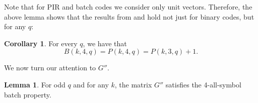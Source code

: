 \documentclass[11pt,a4paper]{article}
\theoremstyle{definition}
\newtheorem{corollary}[theorem]{Corollary}
\newtheorem{lemma}[theorem]{Lemma}
\begin{document}
Note that for PIR and batch codes we consider only unit vectors. Therefore, the above lemma shows that the results from \cite[Lemma 5]{VARDY_YAAKOBI_2016} and \cite[Lemma 14]{FAZELI2015} hold not just for binary codes, but for any $q$:

\begin{corollary}\label{COR:BatchFor_k=4_general_q}
    For every $q$, we have that
    $$
        B(k,4,q) = P(k,4,q) = P(k,3,q) + 1.
    $$
\end{corollary}






We now turn our attention to $G''$.

\begin{lemma}\label{lemma:t=4_G''}
    For odd $q$ and for any $k$, the matrix $G''$ satisfies the 4-all-symbol batch property.
\end{lemma}
\end{document}
